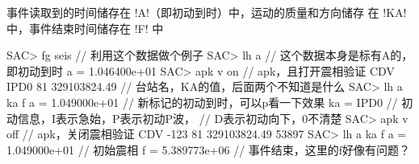 事件读取到的时间储存在 !A!（即初动到时）中，运动的质量和方向储存
在 !KA! 中，事件结束时间储存在 !F! 中

\begin{SACCode}
SAC> fg seis                // 利用这个数据做个例子
SAC> lh a                   // 这个数据本身是标有A的，即初动到时
     a = 1.046400e+01
SAC> apk v on               // apk，且打开震相验证
 CDV IPD0 81 329103824.49   // 台站名，KA的值，后面两个不知道是什么
SAC> lh a ka f
      a = 1.049000e+01      // 新标记的初动到时，可以p看一下效果
     ka = IPD0              // 初动信息，I表示急始，P表示初动P波，
                            // D表示初动向下，0不清楚
SAC> apk v off              // apk，关闭震相验证
 CDV -123 81 329103824.49   53897
SAC> lh a ka f
     a = 1.049000e+01       // 初始震相
     f = 5.389773e+06       // 事件结束，这里的f好像有问题？
\end{SACCode}

